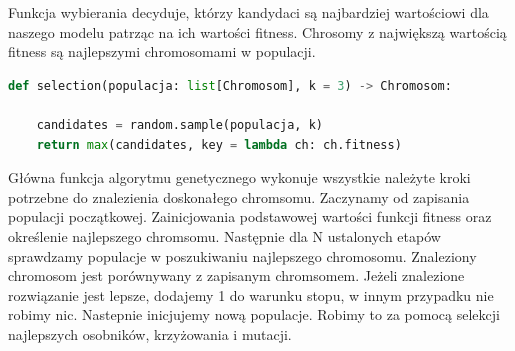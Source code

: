 \documentclass{article}
\begin{document}
Funkcja wybierania decyduje, którzy kandydaci są najbardziej wartościowi dla naszego modelu patrząc na ich wartości fitness. Chrosomy z największą wartością fitness są najlepszymi chromosomami w populacji.

\begin{lstlisting}[language={Python}, label={Funkcja wybierania}, caption={Funkcja odpowiedzialna za wybór najlepszych członków populacji}]
def selection(populacja: list[Chromosom], k = 3) -> Chromosom:
    
    candidates = random.sample(populacja, k)
    return max(candidates, key = lambda ch: ch.fitness)

\end{lstlisting}

Główna funkcja algorytmu genetycznego wykonuje wszystkie należyte kroki potrzebne do znalezienia doskonałego chromsomu. Zaczynamy od zapisania populacji początkowej. Zainicjowania podstawowej wartości funkcji fitness oraz określenie najlepszego chromsomu. Następnie dla N ustalonych etapów sprawdzamy populacje w poszukiwaniu najlepszego chromosomu. Znaleziony chromosom jest porównywany z zapisanym chromsomem. Jeżeli znalezione rozwiązanie jest lepsze, dodajemy 1 do warunku stopu, w innym przypadku nie robimy nic. Nastepnie inicjujemy nową populacje. Robimy to za pomocą selekcji najlepszych osobników, krzyżowania i mutacji. 
\end{document}
